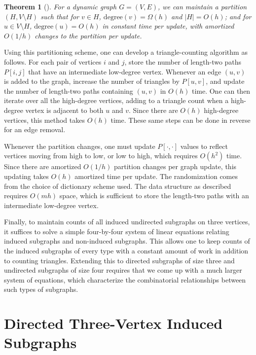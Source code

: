 \documentclass[11pt]{article}
\newtheorem{theorem}{Theorem}[section]
\newcommand{\abs}[1]{{\lvert#1 \rvert}}
\begin{document}
\begin{theorem}[\cite{es-hgadss-09}]
\label{thm-partition}
For a dynamic graph $G=(V,E)$, we can maintain a partition $(H, V\setminus H)$ 
such that for $v\in H$, $\mathrm{degree}(v) = \Omega(h)$ and $\abs{H} = O(h)$;
and for $u \in V\setminus H$, $\mathrm{degree}(u) = O(h)$ in constant time per
update, with amortized $O(1/h)$ changes to the partition per update.
\end{theorem}

Using this partitioning scheme, one can develop a triangle-counting 
algorithm as follows. For each pair of vertices $i$ and $j$, store 
the number of length-two paths $P[i,j]$ that have an intermediate 
low-degree vertex. Whenever an edge $(u,v)$ is added to the graph, 
increase the number of triangles by $P[u,v]$, and update the number of
length-two paths containing $(u,v)$ in $O(h)$ time. One can
then iterate over all the high-degree vertices, adding to a 
triangle count when a 
high-degree vertex is adjacent to both $u$ and $v$. Since there are 
$O(h)$ high-degree vertices, this method takes $O(h)$ time. These same steps 
can be done in reverse for an edge removal.

Whenever the partition changes, one must update $P[\cdot,\cdot]$ values
to reflect vertices moving from high to low, or low to high, which 
requires $O(h^2)$ time. Since there are amortized $O(1/h)$ partition 
changes per graph update, this updating takes $O(h)$ amortized time 
per update. The randomization comes from the choice of dictionary 
scheme used. The data structure as described requires $O(mh)$ space, 
which is sufficient to store the length-two paths with an intermediate 
low-degree vertex. 

Finally, to maintain counts of all induced undirected 
subgraphs on three vertices,
it suffices to solve a simple four-by-four 
system of linear equations relating induced
subgraphs and non-induced subgraphs. This allows one to keep counts 
of the induced subgraphs of every type with a constant amount of 
work in addition to counting triangles.
Extending this to directed subgraphs of size three and undirected
subgraphs of size four requires that we come up with a much larger
system of equations, which characterize the combinatorial
relationships between such types of subgraphs.

\section{Directed Three-Vertex Induced Subgraphs}
\end{document}
